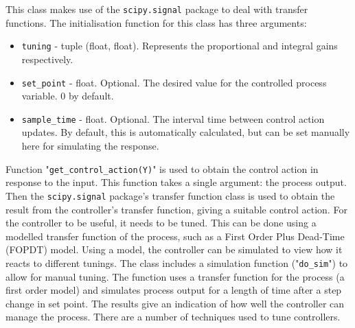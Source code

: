 \documentclass[twoside,a4]{report}
\def\br{\newline \newline \noindent}
\begin{document}
	\noindent
	This class makes use of the \texttt{scipy.signal} package to deal with transfer functions.\br
	The initialisation function for this class has three arguments:
	\begin{itemize}
		\item \texttt{tuning} - tuple (float, float). Represents the proportional and integral gains respectively.
		\item \texttt{set\_point} - float. Optional. The desired value for the controlled process variable. 0 by default.
		\item \texttt{sample\_time} - float. Optional. The interval time between control action updates. By default, this is automatically calculated, but can be set manually here for simulating the response.
	\end{itemize}
	Function "\texttt{get\_control\_action(Y)}" is used to obtain the control action in response to the input. This function takes a single argument: the process output. Then the \texttt{scipy.signal} package's transfer function class is used to obtain the result from the controller's transfer function, giving a suitable control action.
	For the controller to be useful, it needs to be tuned. This can be done using a modelled transfer function of the process, such as a First Order Plus Dead-Time (FOPDT) model. Using a model, the controller can be simulated to view how it reacts to different tunings. The class includes a simulation function ("\texttt{do\_sim}") to allow for manual tuning. The function uses a transfer function for the process (a first order model) and simulates process output for a length of time after a step change in set point. The results give an indication of how well the controller can manage the process. \br
	There are a number of techniques used to tune controllers.
\end{document}

